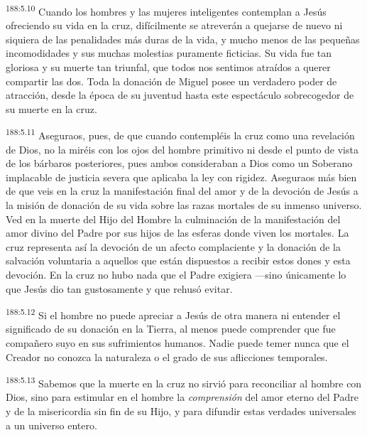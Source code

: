 \par 
\textsuperscript{188:5.10} Cuando los hombres y las mujeres inteligentes contemplan a Jesús ofreciendo su vida en la cruz, difícilmente se atreverán a quejarse de nuevo ni siquiera de las penalidades más duras de la vida, y mucho menos de las pequeñas incomodidades y sus muchas molestias puramente ficticias. Su vida fue tan gloriosa y su muerte tan triunfal, que todos nos sentimos atraídos a querer compartir las dos. Toda la donación de Miguel posee un verdadero poder de atracción, desde la época de su juventud hasta este espectáculo sobrecogedor de su muerte en la cruz.

\par 
\textsuperscript{188:5.11} Aseguraos, pues, de que cuando contempléis la cruz como una revelación de Dios, no la miréis con los ojos del hombre primitivo ni desde el punto de vista de los bárbaros posteriores, pues ambos consideraban a Dios como un Soberano implacable de justicia severa que aplicaba la ley con rigidez. Aseguraos más bien de que veis en la cruz la manifestación final del amor y de la devoción de Jesús a la misión de donación de su vida sobre las razas mortales de su inmenso universo. Ved en la muerte del Hijo del Hombre la culminación de la manifestación del amor divino del Padre por sus hijos de las esferas donde viven los mortales. La cruz representa así la devoción de un afecto complaciente y la donación de la salvación voluntaria a aquellos que están dispuestos a recibir estos dones y esta devoción. En la cruz no hubo nada que el Padre exigiera ---sino únicamente lo que Jesús dio tan gustosamente y que rehusó evitar.

\par 
\textsuperscript{188:5.12} Si el hombre no puede apreciar a Jesús de otra manera ni entender el significado de su donación en la Tierra, al menos puede comprender que fue compañero suyo en sus sufrimientos humanos. Nadie puede temer nunca que el Creador no conozca la naturaleza o el grado de sus aflicciones temporales.

\par 
\textsuperscript{188:5.13} Sabemos que la muerte en la cruz no sirvió para reconciliar al hombre con Dios, sino para estimular en el hombre la \textit{comprensión} del amor eterno del Padre y de la misericordia sin fin de su Hijo, y para difundir estas verdades universales a un universo entero.
